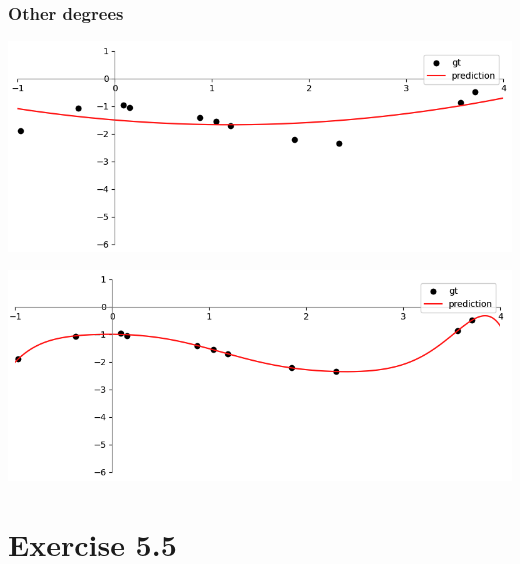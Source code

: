 \documentclass[10pt,aspectratio=169,handout]{beamer}
\begin{document}
\begin{frame}
    \frametitle{Other degrees}

    \begin{minipage}{0.49\textwidth}
        \includegraphics[width=\textwidth]{images/task5-3-d2.png}
    \end{minipage}
    \begin{minipage}{0.49\textwidth}
        \includegraphics[width=\textwidth]{images/task5-3-d9.png}
    \end{minipage}

\end{frame}

\section{Exercise 5.5}
\end{document}

